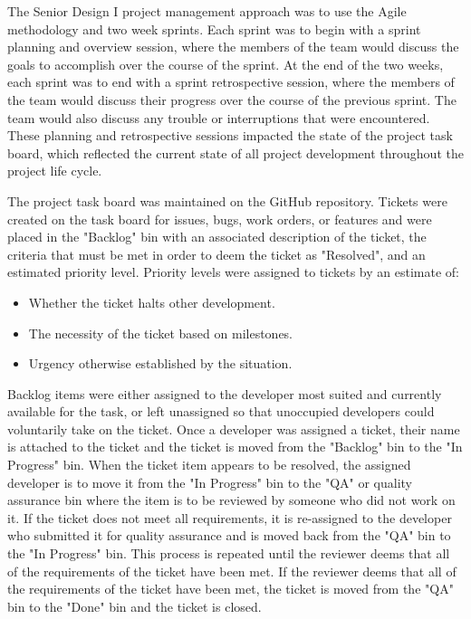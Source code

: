 The Senior Design I project management approach was to use the Agile methodology and two week sprints.  Each sprint was to begin with a sprint planning and overview session, where the members of the team would discuss the goals to accomplish over the course of the sprint.  At the end of the two weeks, each sprint was to end with a sprint retrospective session, where the members of the team would discuss their progress over the course of the previous sprint.  The team would also discuss any trouble or interruptions that were encountered. These planning and retrospective sessions impacted the state of the project task board, which reflected the current state of all project development throughout the project life cycle.

The project task board was maintained on the GitHub repository.  
Tickets were created on the task board for issues, bugs, work orders, or features and were placed in the "Backlog" bin with an associated description of the ticket, the criteria that must be met in order to deem the ticket as "Resolved", and an estimated priority level. 
Priority levels were assigned to tickets by an estimate of:
\begin{itemize}
    \item Whether the ticket halts other development.
    \item The necessity of the ticket based on milestones. 
    \item Urgency otherwise established by the situation.
\end{itemize}

Backlog items were either assigned to the developer most suited and currently available for the task, or left unassigned so that unoccupied developers could voluntarily take on the ticket.  Once a developer was assigned a ticket, their name is attached to the ticket and the ticket is moved from the "Backlog" bin to the "In Progress" bin.  When the ticket item appears to be resolved, the assigned developer is to move it from the "In Progress" bin to the "QA" or quality assurance bin where the item is to be reviewed by someone who did not work on it.  If the ticket does not meet all requirements, it is re-assigned to the developer who submitted it for quality assurance and is moved back from the "QA" bin to the "In Progress" bin. This process is repeated until the reviewer deems that all of the requirements of the ticket have been met.  If the reviewer deems that all of the requirements of the ticket have been met, the ticket is moved from the "QA" bin to the "Done" bin and the ticket is closed.\\

